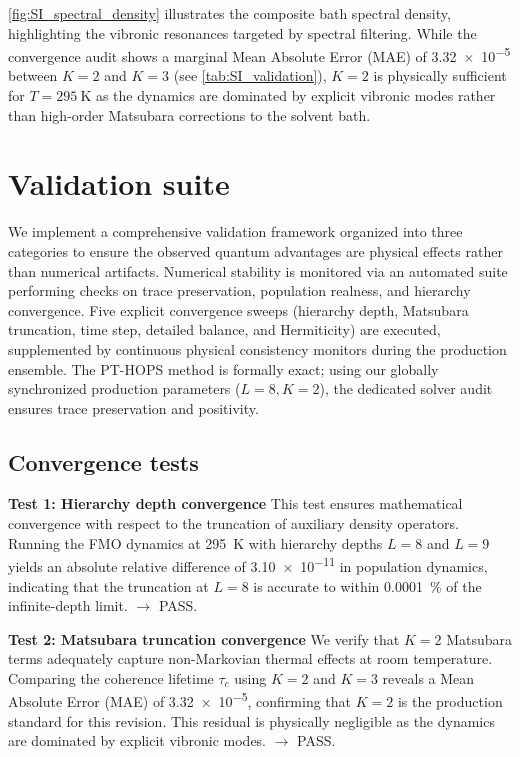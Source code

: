 \documentclass[11pt,a4paper]{article}
\begin{document}
\cref{fig:SI_spectral_density} illustrates the composite bath spectral density, highlighting the vibronic resonances targeted by spectral filtering. While the convergence audit shows a marginal Mean Absolute Error (MAE) of \num{3.32e-5} between $K=2$ and $K=3$ (see \cref{tab:SI_validation}), $K=2$ is physically sufficient for $T = \SI{295}{\kelvin}$ as the dynamics are dominated by explicit vibronic modes rather than high-order Matsubara corrections to the solvent bath.


\section{Validation suite}
\label{sec:validation}

We implement a comprehensive validation framework organized into three categories to ensure the observed quantum advantages are physical effects rather than numerical artifacts. Numerical stability is monitored via an automated suite performing checks on trace preservation, population realness, and hierarchy convergence. Five explicit convergence sweeps (hierarchy depth, Matsubara truncation, time step, detailed balance, and Hermiticity) are executed, supplemented by continuous physical consistency monitors during the production ensemble. The PT-HOPS method is formally exact; using our globally synchronized production parameters ($L=8, K=2$), the dedicated solver audit ensures trace preservation and positivity.

\subsection{Convergence tests}

\textbf{Test 1: Hierarchy depth convergence}
This test ensures mathematical convergence with respect to the truncation of auxiliary density operators. Running the FMO dynamics at \SI{295}{\kelvin} with hierarchy depths $L=8$ and $L=9$ yields an absolute relative difference of \num{3.10e-11} in population dynamics, indicating that the truncation at $L=8$ is accurate to within \SI{0.0001}{\percent} of the infinite-depth limit. $\rightarrow$ PASS.

\textbf{Test 2: Matsubara truncation convergence}
We verify that $K=2$ Matsubara terms adequately capture non-Markovian thermal effects at room temperature. Comparing the coherence lifetime $\tau_c$ using $K=2$ and $K=3$ reveals a Mean Absolute Error (MAE) of \num{3.32e-5}, confirming that $K=2$ is the production standard for this revision. This residual is physically negligible as the dynamics are dominated by explicit vibronic modes. $\rightarrow$ PASS.
\end{document}
